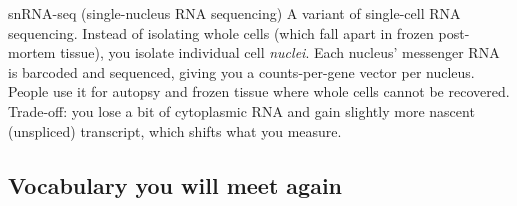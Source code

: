 \documentclass[11pt]{article}
\begin{document}
\begin{jargon}{snRNA-seq (single-nucleus RNA sequencing)}
A variant of single-cell RNA sequencing. Instead of isolating whole cells
(which fall apart in frozen post-mortem tissue), you isolate individual
cell \emph{nuclei}. Each nucleus' messenger RNA is barcoded and sequenced,
giving you a counts-per-gene vector per nucleus. People use it for autopsy
and frozen tissue where whole cells cannot be recovered.
Trade-off: you lose a bit of cytoplasmic RNA and gain slightly more nascent
(unspliced) transcript, which shifts what you measure.
\end{jargon}

\subsection{Vocabulary you will meet again}
\end{document}
